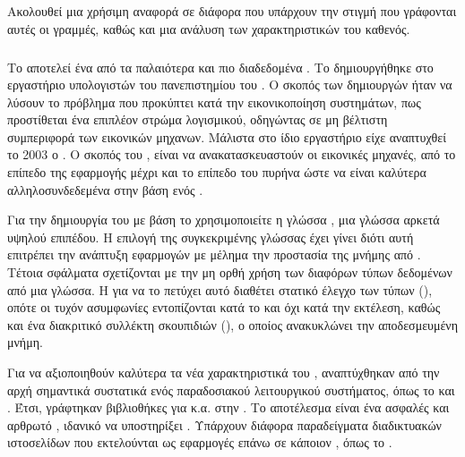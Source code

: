 \subsection{}

Ακολουθεί μια χρήσιμη αναφορά σε διάφορα 
που υπάρχουν την στιγμή που γράφονται αυτές οι γραμμές,
καθώς και μια ανάλυση των χαρακτηριστικών του καθενός.

\subsubsection{}

Το  αποτελεί ένα από τα παλαιότερα και πιο διαδεδομένα
. Το  δημιουργήθηκε στο εργαστήριο
υπολογιστών του πανεπιστημίου του . Ο σκοπός των δημιουργών ήταν
να λύσουν το
πρόβλημα που προκύπτει κατά την εικονικοποίηση συστημάτων, πως
προστίθεται ένα επιπλέον στρώμα λογισμικού, οδηγώντας σε μη
βέλτιστη συμπεριφορά των εικονικών μηχανων\cite{riseOfVirtLibOS}. Μάλιστα στο
ίδιο εργαστήριο είχε αναπτυχθεί το 2003 ο \cite{xenArtofVirt}.
Ο σκοπός του , είναι να ανακατασκευαστούν οι εικονικές
μηχανές, από το επίπεδο της εφαρμογής μέχρι και το επίπεδο
του πυρήνα ώστε να είναι καλύτερα αλληλοσυνδεδεμένα στην βάση
ενός .
\newline

Για την δημιουργία του  με βάση το 
χρησιμοποιείτε η γλώσσα
, μια γλώσσα αρκετά υψηλού επιπέδου. Η επιλογή της
συγκεκριμένης γλώσσας έχει γίνει διότι αυτή επιτρέπει την
ανάπτυξη  εφαρμογών με μέλημα την προστασία της
μνήμης από . Τέτοια σφάλματα σχετίζονται με
την μη ορθή χρήση των διαφόρων τύπων δεδομένων από μια γλώσσα.
Η  για να το πετύχει αυτό διαθέτει στατικό έλεγχο των
τύπων (), οπότε οι τυχόν ασυμφωνίες εντοπίζονται
κατά το  και όχι κατά την εκτέλεση, καθώς και ένα
διακριτικό συλλέκτη σκουπιδιών (), ο οποίος
ανακυκλώνει την αποδεσμευμένη μνήμη.
\newline

Για να αξιοποιηθούν καλύτερα τα νέα χαρακτηριστικά του ,
αναπτύχθηκαν από την αρχή σημαντικά συστατικά ενός παραδοσιακού
λειτουργικού συστήματος, όπως το  και .
Έτσι, γράφτηκαν βιβλιοθήκες για  κ.α. στην
. Το αποτέλεσμα είναι ένα ασφαλές και αρθρωτό ,
ιδανικό να υποστηρίξει . Υπάρχουν διάφορα
παραδείγματα  διαδικτυακών ιστοσελίδων που εκτελούνται
ως  εφαρμογές επάνω σε κάποιον , όπως το \cite{overMirage}.
\newline

